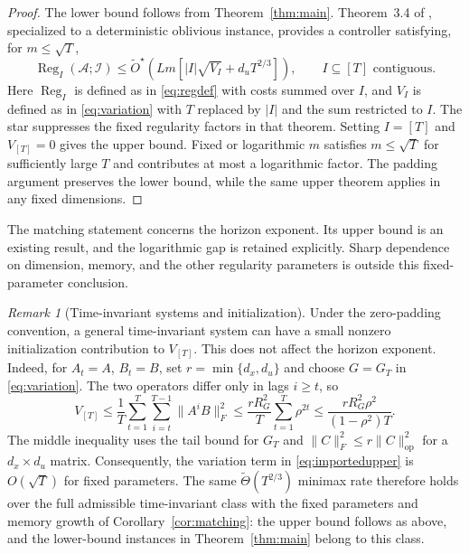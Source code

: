 \documentclass[11pt]{article}
\theoremstyle{remark}
\newtheorem{remark}[theorem]{Remark}
\newcommand{\Reg}{\operatorname{Reg}}
\newcommand{\op}{\mathrm{op}}
\begin{document}
\begin{proof}
The lower bound follows from Theorem~\ref{thm:main}.
Theorem~3.4 of \citet{minasyan}, specialized to a deterministic oblivious
instance, provides a controller satisfying, for $m\le\sqrt T$,
\begin{equation}\label{eq:importedupper}
 \Reg_I(\mathcal A;\mathcal I)\le\widetilde O^{\star}\!\left(
 Lm\left[|I|\sqrt{V_I}+d_uT^{2/3}\right]\right),
 \qquad I\subseteq[T]\text{ contiguous}.
\end{equation}
Here $\Reg_I$ is defined as in \eqref{eq:regdef} with costs summed
over $I$, and $V_I$ is defined as in \eqref{eq:variation} with $T$ replaced by
$|I|$ and the sum restricted to $I$. The star suppresses the fixed
regularity factors in that theorem. Setting $I=[T]$ and $V_{[T]}=0$
gives the upper bound. Fixed or logarithmic $m$ satisfies
$m\le\sqrt T$ for sufficiently large $T$ and contributes at most a
logarithmic factor. The padding argument preserves the lower bound, while
the same upper theorem applies in any fixed dimensions.
\end{proof}

The matching statement concerns the horizon exponent. Its upper bound is
an existing result, and the logarithmic gap is retained explicitly.
Sharp dependence on dimension, memory, and the other regularity parameters
is outside this fixed-parameter conclusion.

\begin{remark}[Time-invariant systems and initialization]\label{rem:lti}
Under the zero-padding convention, a general time-invariant system can have
a small nonzero initialization contribution to $V_{[T]}$. This does not
affect the horizon exponent. Indeed, for $A_t=A$, $B_t=B$, set
$r=\min\{d_x,d_u\}$ and choose $G=G_T$ in \eqref{eq:variation}.
The two operators differ only in lags $i\ge t$, so
\[
 V_{[T]}\le\frac1T\sum_{t=1}^T\sum_{i=t}^{T-1}\|A^iB\|_F^2
 \le\frac{rR_G^2}{T}\sum_{t=1}^T\rho^{2t}
 \le\frac{rR_G^2\rho^2}{(1-\rho^2)T}.
\]
The middle inequality uses the tail bound for $G_T$ and
$\|C\|_F^2\le r\|C\|_{\op}^2$ for a $d_x\times d_u$ matrix.
Consequently, the variation term in \eqref{eq:importedupper} is
$O(\sqrt T)$ for fixed parameters. The same
$\widetilde\Theta(T^{2/3})$ minimax rate therefore holds over the full
admissible time-invariant class with the fixed parameters and memory growth
of Corollary~\ref{cor:matching}: the upper bound follows as above, and
the lower-bound instances in Theorem~\ref{thm:main} belong to this class.
\end{remark}
\end{document}
